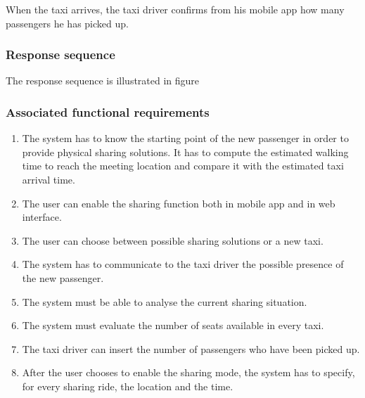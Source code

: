 When the taxi arrives, the taxi driver confirms from his mobile app how many passengers he has picked up.

\subsubsection{Response sequence}
The response sequence is illustrated in figure

\subsubsection{Associated functional requirements}
\begin{enumerate}
\item The system has to know the starting point of the new passenger in order to provide physical sharing solutions. It has to compute the estimated walking time to reach the meeting location and compare it with the estimated taxi arrival time.
\item The user can enable the sharing function both in mobile app and in web interface.
\item The user can choose between possible sharing solutions or a new taxi.
\item The system has to communicate to the taxi driver the possible presence of the new passenger.
\item The system must be able to analyse the current sharing situation.
\item The system must evaluate the number of seats available in every taxi.
\item The taxi driver can insert the number of passengers who have been picked up.
\item After the user chooses to enable the sharing mode, the system has to specify, for every sharing ride, the location and the time.
\end{enumerate}